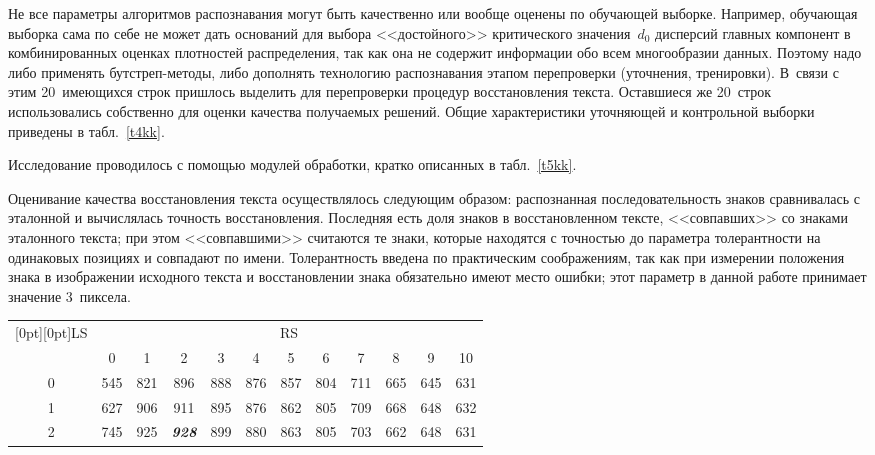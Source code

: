 \begin{multicols}{2}
      
      Не все параметры алгоритмов распознавания могут быть качественно или вообще оценены 
по обучающей выборке. Например, обучающая выборка сама по себе не может дать оснований для 
выбора <<достойного>> критического значения~$d_0$ дисперсий главных компонент в 
комбинированных оценках плотностей распределения, так как она не содержит информации обо 
всем многообразии данных. Поэтому надо либо применять бутстреп-методы, либо дополнять 
технологию распознавания этапом перепроверки (уточнения, тренировки). В~связи с этим 
20~имеющихся строк пришлось выделить для перепроверки процедур восстановления текста. 
Оставшиеся же 20~строк использовались собственно для оценки качества получаемых решений. 
Общие характеристики уточняющей и контрольной выборки приведены в табл.~\ref{t4kk}.

      Исследование проводилось с помощью модулей обработки, кратко описанных в 
табл.~\ref{t5kk}.
     
      Оценивание качества восстановления текста осуществлялось следующим образом: 
распознанная последовательность знаков сравнивалась с эталонной и вычислялась точность 
восстановления. Последняя есть доля знаков в восстановленном тексте, 
<<совпавших>> со знаками эталонного текста; при этом <<совпавшими>> считаются те знаки, 
которые находятся с точностью до параметра толерантности на одинаковых позициях и совпадают 
по имени. Толерантность введена по практическим соображениям, так как при измерении 
положения знака в изображении исходного текста и восстановлении знака обязательно имеют 
место ошибки; этот параметр в данной работе принимает значение 3~пиксела. 

\begin{table*}\small %
\begin{center}
\vspace*{2ex}

\tabcolsep=10pt
\begin{tabular}{|c|c|c|c|c|c|c|c|c|c|c|c|}
\hline
\multicolumn{1}{|c|}{\raisebox{-6pt}[0pt][0pt]{LS}}& \multicolumn{11}{c|}{RS}\\
\cline{2-12}

&0&1&2&3&4&5&6&7&8&9&10\\
\hline
0&545&821&896&888&876&857&804&711&665&645&631\\
1&627&906&911&895&876&862&805&709&668&648&632\\
2&745&925&{\bfseries\textit{928}}&899&880&863&805&703&662&648&631\\
\hline
\end{tabular}
\end{center}
\end{table*}
      

\end{multicols}
